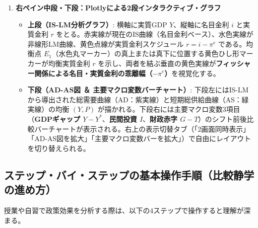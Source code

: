 \documentclass[lualatex,a4paper,11pt,ja=standard]{bxjsarticle}
\begin{document}
\begin{enumerate}[label=\textbf{(\arabic*)},leftmargin=10mm]
  \item \textbf{右ペイン中段・下段：Plotlyによる2段インタラクティブ・グラフ}
  \begin{itemize}[leftmargin=5mm,noitemsep]
    \item \textbf{上段（IS-LM分析グラフ）}: 横軸に実質GDP $Y$、縦軸に名目金利 $i$ と実質金利 $r$ をとる。赤実線が現在のIS曲線（名目金利ベース）、水色実線が非線形LM曲線、黄色点線が実質金利スケジュール $r = i - \pi^e$ である。均衡点 $E_1$（水色丸マーカー）の真上または真下に位置する黄色ひし形マーカーが均衡実質金利 $r$ を示し、両者を結ぶ垂直の黄色実線が\textbf{フィッシャー関係による名目・実質金利の乖離幅（$-\pi^e$）}を視覚化する。
    \item \textbf{下段（AD-AS図 ＆ 主要マクロ変数バーチャート）}: 下段左にはIS-LMから導出された総需要曲線（AD：紫実線）と短期総供給曲線（AS：緑実線）の均衡 $(Y, P)$ が描かれる。下段右には主要マクロ変数3項目（\textbf{GDPギャップ $Y - Y^*$}、\textbf{民間投資 $I$}、\textbf{財政赤字 $G - T$}）のシフト前後比較バーチャートが表示される。右上の表示切替タブ（「2画面同時表示」「AD-AS図を拡大」「主要マクロ変数バーを拡大」）で自由にレイアウトを切り替えられる。
  \end{itemize}
\end{enumerate}

\subsection{ステップ・バイ・ステップの基本操作手順（比較静学の進め方）}

授業や自習で政策効果を分析する際は、以下の4ステップで操作すると理解が深まる。
\end{document}
